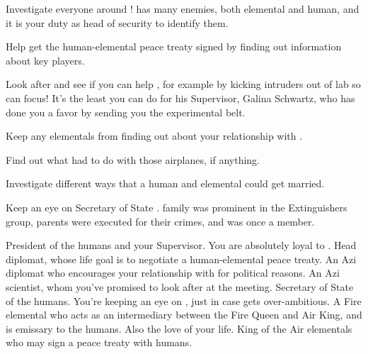 \documentclass[char]{elementals}
\begin{document}
\begin{itemz}[Goals]
  \item Investigate everyone around \cLeader{\full}!  \cLeader{\They} has many enemies, both elemental and human, and it is your duty as head of security to identify them.
  \item Help \cLeader{} get the human-elemental peace treaty signed by finding out information about key players.
  \item Look after \cScientist{\full} and see if you can help \cScientist{\them}, for example by kicking intruders out of \cScientist{\their} lab so \cScientist{\they} can focus!  It's the least you can do for his Supervisor, Galina Schwartz, who has done you a favor by sending you the experimental belt.
  \item Keep any elementals from finding out about your relationship with \cJuliet{}.
  \item Find out what \cJuliet{} had to do with those airplanes, if anything.
  \item Investigate different ways that a human and elemental could get married.
  \item Keep an eye on Secretary of State \cDema{\full}.  \cDema{\Their} family was prominent in the Extinguishers group, \cDema{\their} parents were executed for their crimes, and 
  \cDema{\they} \cDema{\themself} was once a member.
\end{itemz}

\begin{contacts}
  \contact{\cLeader{}} President of the humans and your Supervisor.  You are absolutely loyal to \cLeader{\them}.
  \contact{\cAvatar{}} Head diplomat, whose life goal is to negotiate a human-elemental peace treaty.
  \contact{\cDiplomat{}} An Azi diplomat who encourages your relationship with \cJuliet{} for political reasons.
  \contact{\cScientist{}} An Azi scientist, whom you've promised to look after at the meeting.
  \contact{\cDema{}} Secretary of State of the humans.  You're keeping an eye on \cDema{\them}, just in case \cDema{\they} gets over-ambitious.
  \contact{\cJuliet{}} A Fire elemental who acts as an intermediary between the Fire Queen and Air King, and is emissary to the humans.  Also the love of your life.
  \contact{\cKing{}} King of the Air elementals who may sign a peace treaty with humans.
\end{contacts}
\end{document}
